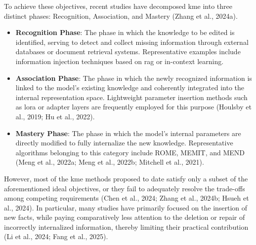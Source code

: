 \documentclass[a4paper,fleqn]{cas-sc}
\begin{document}
To achieve these objectives, recent studies have decomposed \gls{kme} into three distinct phases: Recognition, Association, and Mastery (Zhang et al., 2024a).

\begin{itemize}
    \item{\textbf{Recognition Phase}:
    The phase in which the knowledge to be edited is identified, serving to detect and collect missing information through external databases or document retrieval systems. Representative examples include information injection techniques based on \gls{rag} or in-context learning.}

    \item{\textbf{Association Phase}:
    The phase in which the newly recognized information is linked to the model's existing knowledge and coherently integrated into the internal representation space. Lightweight parameter insertion methods such as \gls{lora} or adapter layers are frequently employed for this purpose (Houlsby et al., 2019; Hu et al., 2022).}
    
    \item{\textbf{Mastery Phase}:
    The phase in which the model's internal parameters are directly modified to fully internalize the new knowledge. Representative algorithms belonging to this category include ROME, MEMIT, and MEND (Meng et al., 2022a; Meng et al., 2022b; Mitchell et al., 2021).}
\end{itemize}

However, most of the \gls{kme} methods proposed to date satisfy only a subset of the aforementioned ideal objectives, or they fail to adequately resolve the trade-offs among competing requirements (Chen et al., 2024; Zhang et al., 2024b; Hsueh et al., 2024). In particular, many studies have primarily focused on the insertion of new facts, while paying comparatively less attention to the deletion or repair of incorrectly internalized information, thereby limiting their practical contribution (Li et al., 2024; Fang et al., 2025).
\end{document}
